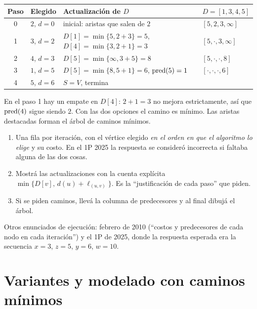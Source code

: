 \begin{center}
\small
\begin{tabularx}{\textwidth}{@{}c>{\raggedright\arraybackslash}p{1.9cm}>{\raggedright\arraybackslash}X>{\raggedright\arraybackslash}p{2.5cm}@{}}
\toprule
Paso & Elegido & Actualización de $D$ & $D=[1,3,4,5]$ \\
\midrule
0 & $2$, $d=0$ & inicial: aristas que salen de $2$ & $[5,2,3,\infty]$ \\
1 & $3$, $d=2$ & $D[1]=\min\{5,2+3\}=5$, $D[4]=\min\{3,2+1\}=3$ & $[5,\cdot,3,\infty]$ \\
2 & $4$, $d=3$ & $D[5]=\min\{\infty,3+5\}=8$ & $[5,\cdot,\cdot,8]$ \\
3 & $1$, $d=5$ & $D[5]=\min\{8,5+1\}=6$, $\mathrm{pred}(5)=1$ & $[\cdot,\cdot,\cdot,6]$ \\
4 & $5$, $d=6$ & $S=V$, termina & \\
\bottomrule
\end{tabularx}
\end{center}

En el paso 1 hay un empate en $D[4]$: $2+1=3$ no mejora estrictamente, así que $\mathrm{pred}(4)$ sigue siendo $2$. Con las dos opciones el camino es mínimo. Las aristas destacadas forman el árbol de caminos mínimos.

\begin{receta}
\begin{enumerate}
  \item Una fila por iteración, con el vértice elegido \emph{en el orden en que el algoritmo lo elige} y su costo. En el 1P 2025 la respuesta se consideró incorrecta si faltaba alguna de las dos cosas.
  \item Mostrá las actualizaciones con la cuenta explícita $\min\{D[v],\,d(u)+\ell_{(u,v)}\}$. Es la ``justificación de cada paso'' que piden.
  \item Si se piden caminos, llevá la columna de predecesores y al final dibujá el árbol.
\end{enumerate}
\end{receta}

Otros enunciados de ejecución: febrero de 2010 (``costos y predecesores de cada nodo en cada iteración'') y el 1P de 2025, donde la respuesta esperada era la secuencia $x=3$, $z=5$, $y=6$, $w=10$.

\section{Variantes y modelado con caminos mínimos}

